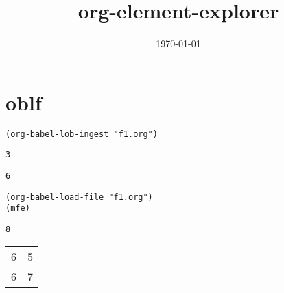 \documentclass[11pt]{article}
\date{\today}
\title{org-element-explorer}
\begin{document}
\section{oblf}
\label{sec-1}

\begin{verbatim}
(org-babel-lob-ingest "f1.org")
\end{verbatim}

\begin{verbatim}
3
\end{verbatim}


\begin{verbatim}
6
\end{verbatim}



\begin{verbatim}
(org-babel-load-file "f1.org")
(mfe)
\end{verbatim}

\begin{verbatim}
8
\end{verbatim}

\begin{center}
\begin{tabular}{rr}
6 & 5\\
6 & 7\\
\end{tabular}
\end{center}
\end{document}
